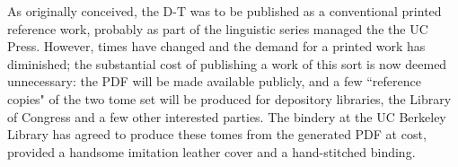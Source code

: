 As originally conceived, the D-T was to be published as a conventional printed reference work, probably as part of the linguistic series managed the the UC Press.  However, times have changed and the demand for a printed work has diminished; the substantial cost of publishing a work of this sort is now deemed unnecessary: the PDF will be made available publicly, and a few ``reference copies" of the two tome set will be produced for depository libraries, the Library of Congress and a few other interested parties.  The bindery at the UC Berkeley Library has agreed to produce these tomes from the generated PDF at cost, provided a handsome imitation leather cover and a hand-stitched binding.
